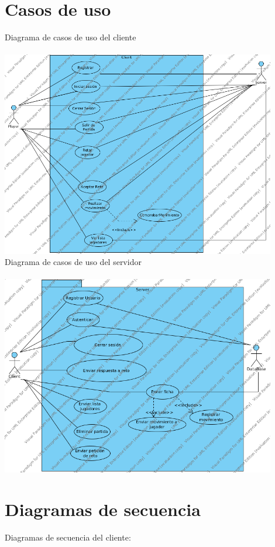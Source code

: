 \documentclass[a4paper,11pt,oneside]{article}
\begin{document}
\section{Casos de uso}

Diagrama de casos de uso del cliente
\\ \\
\includegraphics[width=0.9\textwidth]{img/cdu_Cliente.png}\\[1cm]

Diagrama de casos de uso del servidor
\\ \\
\includegraphics[width=0.9\textwidth]{img/cdu_Servidor.png}\\[1cm]

\section{Diagramas de secuencia}
Diagramas de secuencia del cliente:
\end{document}
